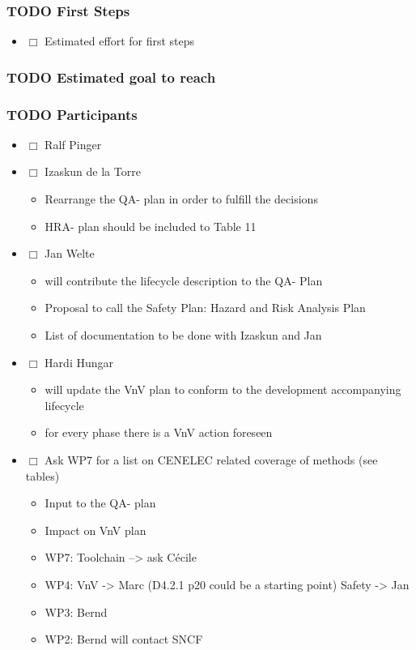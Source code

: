 \documentclass[a4paper,german]{article}
\begin{document}
\subsubsection{\textbf{TODO} First Steps}
\label{sec-1-1-1}

\begin{itemize}
\item $\Box$ Estimated effort for first steps
\end{itemize}
\subsubsection{\textbf{TODO} Estimated goal to reach}
\label{sec-1-1-2}
\subsubsection{\textbf{TODO} Participants}
\label{sec-1-1-3}

\begin{itemize}
\item $\Box$ Ralf Pinger
\item $\Box$ Izaskun de la Torre
\begin{itemize}
\item Rearrange the QA- plan in order to fulfill the decisions
\item HRA- plan should be included to Table 11
\end{itemize}
\item $\Box$ Jan Welte
\begin{itemize}
\item will contribute the lifecycle description to the QA- Plan
\item Proposal to call the Safety Plan: Hazard and Risk Analysis Plan
\item List of documentation to be done with Izaskun and Jan
\end{itemize}
\item $\Box$ Hardi Hungar
\begin{itemize}
\item will update the VnV plan to conform to the development accompanying lifecycle
\item for every phase there is a VnV action foreseen
\end{itemize}
\item $\Box$ Ask WP7 for a list on CENELEC related coverage of methods (see tables)
\begin{itemize}
\item Input to the QA- plan
\item Impact on VnV plan
\item WP7: Toolchain --> ask Cécile
\item WP4: VnV -> Marc (D4.2.1 p20 could be a starting point) Safety -> Jan
\item WP3: Bernd
\item WP2: Bernd will contact SNCF
\end{itemize}
\end{itemize}
\end{document}
